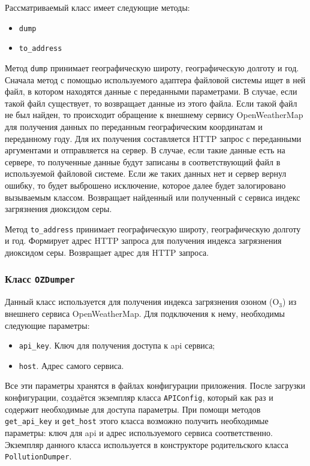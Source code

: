 Рассматриваемый класс имеет следующие методы:
\begin{itemize}
\item \texttt{dump}
\item \texttt{to\_address}
\end{itemize}

Метод \texttt{dump} принимает географическую широту, географическую долготу и год.
Сначала метод с помощью используемого адаптера файловой системы ищет в ней файл, в котором находятся данные с переданными параметрами.
В случае, если такой файл существует, то возвращает данные из этого файла.
Если такой файл не был найден, то происходит обращение к внешнему сервису OpenWeatherMap для получения данных по переданным географическим координатам и переданному году.
Для их получения составляется HTTP запрос с переданными аргументами и отправляется на сервер.
В случае, если такие данные есть на сервере, то полученные данные будут записаны в соответствующий файл в используемой файловой системе.
Если же таких данных нет и сервер вернул ошибку, то будет выброшено исключение, которое далее будет залогировано вызываемым классом.
Возвращает найденный или полученный с сервиса индекс загрязнения диоксидом серы.

Метод \texttt{to\_address} принимает географическую широту, географическую долготу и год.
Формирует адрес HTTP запроса для получения индекса загрязнения диоксидом серы.
Возвращает адрес для HTTP запроса.



\subsubsection{Класс \texttt{OZDumper}}
Данный класс используется для получения индекса загрязнения озоном ($ \text{O}_{\text{3}} $) из внешнего сервиса OpenWeatherMap.
Для подключения к нему, необходимы следующие параметры:

\begin{itemize}
\item \texttt{api\_key}. Ключ для получения доступа к api сервиса;
\item \texttt{host}. Адрес самого сервиса.
\end{itemize}

Все эти параметры хранятся в файлах конфигурации приложения.
После загрузки конфигурации, создаётся экземпляр класса \texttt{APIConfig}, который как раз и содержит необходимые для доступа параметры.
При помощи методов \texttt{get\_api\_key} и \texttt{get\_host} этого класса возможно получить необходимые параметры: ключ для api и адрес используемого сервиса соответственно.
Экземпляр данного класса используется в конструкторе родительского класса \texttt{PollutionDumper}.

